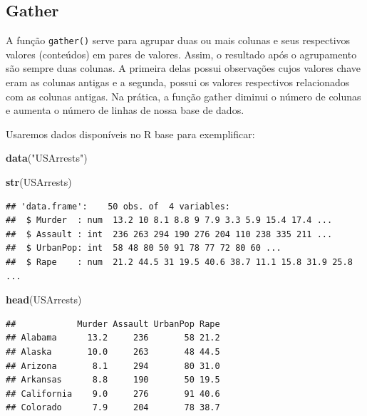 \documentclass[]{book}
\newenvironment{Shaded}{\begin{snugshade}}{\end{snugshade}}
\newcommand{\KeywordTok}[1]{\textcolor[rgb]{0.13,0.29,0.53}{\textbf{#1}}}
\newcommand{\StringTok}[1]{\textcolor[rgb]{0.31,0.60,0.02}{#1}}
\newcommand{\CommentTok}[1]{\textcolor[rgb]{0.56,0.35,0.01}{\textit{#1}}}
\newcommand{\OperatorTok}[1]{\textcolor[rgb]{0.81,0.36,0.00}{\textbf{#1}}}
\newcommand{\NormalTok}[1]{#1}
\begin{document}
\subsection{Gather}\label{gather}

A função \texttt{gather()} serve para agrupar duas ou mais colunas e
seus respectivos valores (conteúdos) em pares de valores. Assim, o
resultado após o agrupamento são sempre duas colunas. A primeira delas
possui observações cujos valores chave eram as colunas antigas e a
segunda, possui os valores respectivos relacionados com as colunas
antigas. Na prática, a função gather diminui o número de colunas e
aumenta o número de linhas de nossa base de dados.

Usaremos dados disponíveis no R base para exemplificar:

\begin{Shaded}
\begin{Highlighting}[]
\KeywordTok{data}\NormalTok{(}\StringTok{"USArrests"}\NormalTok{)}

\KeywordTok{str}\NormalTok{(USArrests)}
\end{Highlighting}
\end{Shaded}

\begin{verbatim}
## 'data.frame':    50 obs. of  4 variables:
##  $ Murder  : num  13.2 10 8.1 8.8 9 7.9 3.3 5.9 15.4 17.4 ...
##  $ Assault : int  236 263 294 190 276 204 110 238 335 211 ...
##  $ UrbanPop: int  58 48 80 50 91 78 77 72 80 60 ...
##  $ Rape    : num  21.2 44.5 31 19.5 40.6 38.7 11.1 15.8 31.9 25.8 ...
\end{verbatim}

\begin{Shaded}
\begin{Highlighting}[]
\KeywordTok{head}\NormalTok{(USArrests)}
\end{Highlighting}
\end{Shaded}

\begin{verbatim}
##            Murder Assault UrbanPop Rape
## Alabama      13.2     236       58 21.2
## Alaska       10.0     263       48 44.5
## Arizona       8.1     294       80 31.0
## Arkansas      8.8     190       50 19.5
## California    9.0     276       91 40.6
## Colorado      7.9     204       78 38.7
\end{verbatim}

\begin{Shaded}
\end{Shaded}
\end{document}
